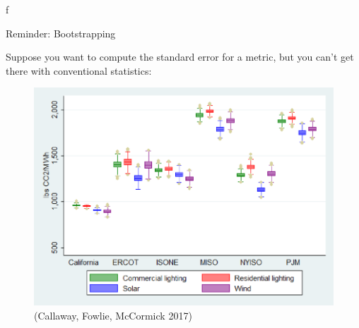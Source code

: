 \documentclass[mathserif, aspectratio=169]{beamer}
\begin{document}
 f\begin{frame}{Reminder: Bootstrapping}

Suppose you want to compute the standard error for a metric, but you can't get there with conventional statistics:

\begin{figure}
\includegraphics[height=0.7\textheight]{MEDR}
\caption*{\tiny (Callaway, Fowlie, McCormick 2017)}
\end{figure}
\end{frame}
\end{document}
